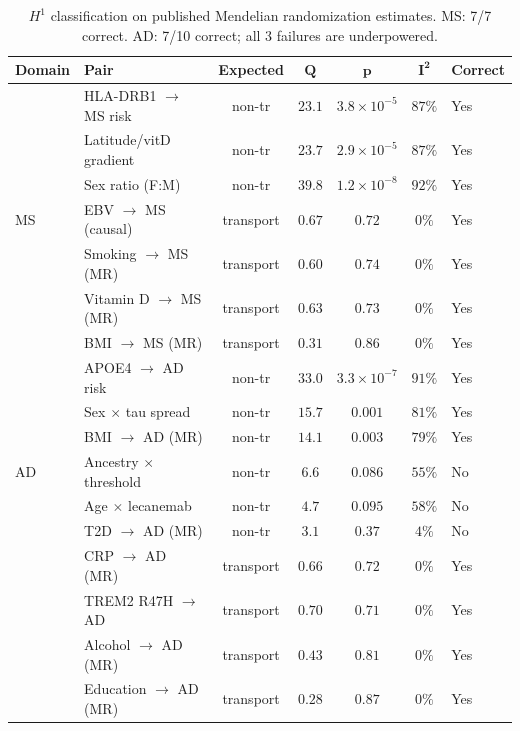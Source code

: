 \documentclass{article}
\begin{document}
\begin{table}[t]
\centering
\caption{$H^1$ classification on published Mendelian randomization estimates. MS: 7/7 correct. AD: 7/10 correct; all 3 failures are underpowered.}
\label{tab:realdata-h1}
\small
\begin{tabular}{@{}llccccl@{}}
\toprule
\textbf{Domain} & \textbf{Pair} & \textbf{Expected} & $\boldsymbol{Q}$ & $\boldsymbol{p}$ & $\boldsymbol{I^2}$ & \textbf{Correct} \\
\midrule
\multirow{7}{*}{MS}
& HLA-DRB1 $\to$ MS risk & non-tr & $23.1$ & $3.8 \times 10^{-5}$ & $87\%$ & Yes \\
& Latitude/vitD gradient & non-tr & $23.7$ & $2.9 \times 10^{-5}$ & $87\%$ & Yes \\
& Sex ratio (F:M) & non-tr & $39.8$ & $1.2 \times 10^{-8}$ & $92\%$ & Yes \\
& EBV $\to$ MS (causal) & transport & $0.67$ & $0.72$ & $0\%$ & Yes \\
& Smoking $\to$ MS (MR) & transport & $0.60$ & $0.74$ & $0\%$ & Yes \\
& Vitamin D $\to$ MS (MR) & transport & $0.63$ & $0.73$ & $0\%$ & Yes \\
& BMI $\to$ MS (MR) & transport & $0.31$ & $0.86$ & $0\%$ & Yes \\
\midrule
\multirow{7}{*}{AD}
& APOE4 $\to$ AD risk & non-tr & $33.0$ & $3.3 \times 10^{-7}$ & $91\%$ & Yes \\
& Sex $\times$ tau spread & non-tr & $15.7$ & $0.001$ & $81\%$ & Yes \\
& BMI $\to$ AD (MR) & non-tr & $14.1$ & $0.003$ & $79\%$ & Yes \\
& Ancestry $\times$ threshold & non-tr & $6.6$ & $0.086$ & $55\%$ & No \\
& Age $\times$ lecanemab & non-tr & $4.7$ & $0.095$ & $58\%$ & No \\
& T2D $\to$ AD (MR) & non-tr & $3.1$ & $0.37$ & $4\%$ & No \\
& CRP $\to$ AD (MR) & transport & $0.66$ & $0.72$ & $0\%$ & Yes \\
& TREM2 R47H $\to$ AD & transport & $0.70$ & $0.71$ & $0\%$ & Yes \\
& Alcohol $\to$ AD (MR) & transport & $0.43$ & $0.81$ & $0\%$ & Yes \\
& Education $\to$ AD (MR) & transport & $0.28$ & $0.87$ & $0\%$ & Yes \\
\bottomrule
\end{tabular}
\end{table}
\end{document}
